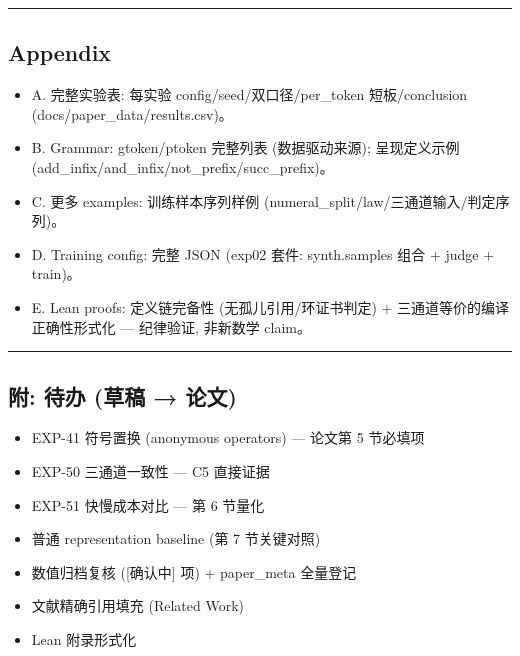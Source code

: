 \documentclass[
]{article}
\providecommand{\tightlist}{%
  \setlength{\itemsep}{0pt}\setlength{\parskip}{0pt}}
\begin{document}
\begin{center}\rule{0.5\linewidth}{0.5pt}\end{center}

\subsection{Appendix}\label{appendix}

\begin{itemize}
\tightlist
\item
  A. 完整实验表: 每实验 config/seed/双口径/per\_token 短板/conclusion
  (docs/paper\_data/results.csv)。
\item
  B. Grammar: gtoken/ptoken 完整列表 (数据驱动来源); 呈现定义示例
  (add\_infix/and\_infix/not\_prefix/succ\_prefix)。
\item
  C. 更多 examples: 训练样本序列样例
  (numeral\_split/law/三通道输入/判定序列)。
\item
  D. Training config: 完整 JSON (exp02 套件: synth.samples 组合 + judge
  + train)。
\item
  E. Lean proofs: 定义链完备性 (无孤儿引用/环证书判定) +
  三通道等价的编译正确性形式化 --- 纪律验证, 非新数学 claim。
\end{itemize}

\begin{center}\rule{0.5\linewidth}{0.5pt}\end{center}

\subsection{附: 待办 (草稿 →
论文)}\label{ux9644-ux5f85ux529e-ux8349ux7a3f-ux8bbaux6587}

\begin{itemize}
\tightlist
\item[$\square$]
  EXP-41 符号置换 (anonymous operators) --- 论文第 5 节必填项
\item[$\square$]
  EXP-50 三通道一致性 --- C5 直接证据
\item[$\square$]
  EXP-51 快慢成本对比 --- 第 6 节量化
\item[$\square$]
  普通 representation baseline (第 7 节关键对照)
\item[$\square$]
  数值归档复核 ({[}确认中{]} 项) + paper\_meta 全量登记
\item[$\square$]
  文献精确引用填充 (Related Work)
\item[$\square$]
  Lean 附录形式化
\end{itemize}
\end{document}
